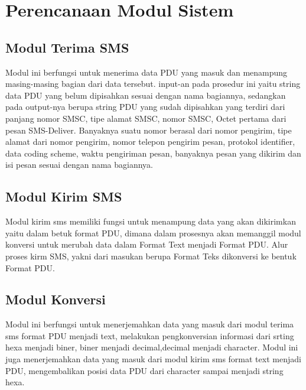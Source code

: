 \documentclass[12pt,a4paper]{article}
\begin{document}
\section{Perencanaan Modul Sistem}
\subsection{Modul Terima SMS}
Modul ini berfungsi untuk menerima data PDU yang masuk dan menampung masing-masing bagian dari data tersebut.
input-an pada prosedur ini yaitu string data PDU yang belum dipisahkan sesuai dengan nama bagiannya, sedangkan pada output-nya
berupa string PDU yang sudah dipisahkan yang terdiri dari panjang nomor SMSC, tipe alamat
SMSC, nomor SMSC, Octet pertama dari pesan SMS-Deliver. Banyaknya suatu nomor berasal dari nomor pengirim, tipe alamat dari nomor pengirim, nomor telepon pengirim pesan, protokol identifier, data coding scheme, waktu pengiriman pesan, banyaknya
pesan yang dikirim dan isi pesan sesuai dengan nama bagiannya. 
\subsection{Modul Kirim SMS}
Modul kirim sms memiliki fungsi untuk menampung data yang akan dikirimkan yaitu dalam betuk format PDU, dimana dalam prosesnya akan memanggil modul konversi untuk merubah data dalam Format Text menjadi Format PDU. Alur proses kirm SMS, yakni dari masukan berupa Format Teks dikonversi ke bentuk Format PDU. 
\subsection{ Modul Konversi}
Modul ini berfungsi untuk menerjemahkan data yang masuk dari modul terima sms  format PDU menjadi  text,  melakukan pengkonversian informasi dari srting hexa menjadi biner, biner menjadi decimal,decimal menjadi character. Modul ini juga menerjemahkan data yang masuk  dari modul kirim sms format text menjadi PDU, mengembalikan posisi data PDU dari character sampai menjadi string hexa. 
\end{document}
